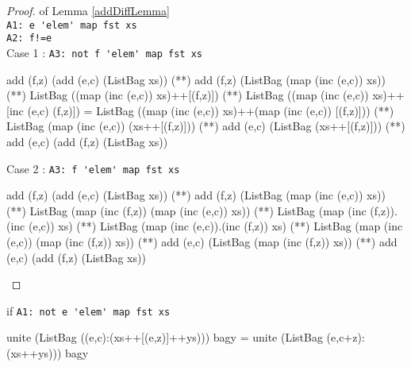 \begin{proof} of Lemma \ref{addDiffLemma}\\
\verb|A1: e 'elem' map fst xs|\\
\verb|A2: f!=e|\\
Case 1 : \verb|A3: not f 'elem' map fst xs|
\begin{code}
add (f,z) (add (e,c) (ListBag xs)) 
             (**) add (f,z) (ListBag (map (inc (e,c)) xs))
             (**) ListBag ((map (inc (e,c)) xs)++[(f,z)])
             (**) ListBag ((map (inc (e,c)) xs)++[inc (e,c) (f,z)])
             = ListBag ((map (inc (e,c)) xs)++(map (inc (e,c)) [(f,z)]))
             (**) ListBag (map (inc (e,c)) (xs++[(f,z)]))
             (**) add (e,c) (ListBag (xs++[(f,z)]))
             (**) add (e,c) (add (f,z) (ListBag xs))
\end{code}
Case 2 : \verb|A3: f 'elem' map fst xs|
\begin{code}
add (f,z) (add (e,c) (ListBag xs)) 
             (**) add (f,z) (ListBag (map (inc (e,c)) xs))
             (**) ListBag (map (inc (f,z)) (map (inc (e,c)) xs))
             (**) ListBag (map (inc (f,z)).(inc (e,c)) xs)
             (**) ListBag (map (inc (e,c)).(inc (f,z)) xs)
             (**) ListBag (map (inc (e,c)) (map (inc (f,z)) xs))
             (**) add (e,c) (ListBag (map (inc (f,z)) xs))
             (**) add (e,c) (add (f,z) (ListBag xs))
\end{code}
\end{proof}
\begin{lemma}\label{incLemma}if  \verb|A1: not e 'elem' map fst xs|
\begin{code}
unite (ListBag ((e,c):(xs++[(e,z)]++ys))) bagy 
                 = unite (ListBag (e,c+z):(xs++ys))) bagy
\end{code}
\end{lemma}
